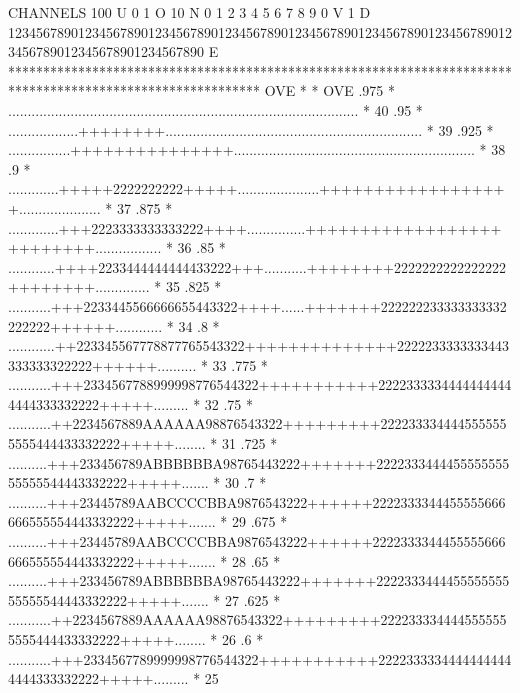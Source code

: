 \begin{Listing}
 CHANNELS 100 U 0                                                                                                  1 O 
           10 N 0        1         2         3         4         5         6         7         8         9         0 V 
            1 D 1234567890123456789012345678901234567890123456789012345678901234567890123456789012345678901234567890 E 
            ************************************************************************************************************
   OVE      *                                                                                                          * OVE
      .975  *             ..........................................................................................   *  40
      .95   *           ..................++++++++..................................................................   *  39
      .925  *          ................+++++++++++++++..............................................................   *  38
      .9    *          .............+++++2222222222+++++.....................++++++++++++++++++.....................   *  37
      .875  *         .............+++2223333333333222++++...............++++++++++++++++++++++++++.................   *  36
      .85   *        ............++++2233444444444433222+++...........++++++++2222222222222222++++++++..............   *  35
      .825  *        ...........+++2233445566666655443322++++......+++++++222222233333333332222222++++++............   *  34
      .8    *       ............++223345567778877765543322++++++++++++++2222233333333443333333322222++++++..........   *  33
      .775  *       ...........+++2334567788999998776544322+++++++++++22223333344444444444444333332222+++++.........   *  32
      .75   *       ...........++2234567889AAAAAA98876543322+++++++++2222333344445555555555444433332222+++++........   *  31
      .725  *       ..........+++233456789ABBBBBBA98765443222+++++++222233344445555555555555544443332222+++++.......   *  30
      .7    *       ..........+++23445789AABCCCCBBA9876543222++++++2222333344455555666666555554443332222+++++.......   *  29
      .675  *       ..........+++23445789AABCCCCBBA9876543222++++++2222333344455555666666555554443332222+++++.......   *  28
      .65   *       ..........+++233456789ABBBBBBA98765443222+++++++222233344445555555555555544443332222+++++.......   *  27
      .625  *       ...........++2234567889AAAAAA98876543322+++++++++2222333344445555555555444433332222+++++........   *  26
      .6    *       ...........+++2334567789999998776544322+++++++++++22223333344444444444444333332222+++++.........   *  25

\end{Listing}
